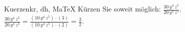 \begin{MAufgabe}{Kuerzen}{kr, dh, MaTeX}
K\"urzen Sie soweit m\"oglich: $\frac{30\, y^4\, z^5}{20\, y^4\, z^5}$.\\ 
\ifLsg\MLoesung
\quad $\frac{30\, y^4\, z^5}{20\, y^4\, z^5}=\frac{(10\, y^4\, z^5)\cdot(3)}{(10\, y^4\, z^5)\cdot(2)}=\frac{3}{2}$.\else\relax\fi
 \end{MAufgabe}